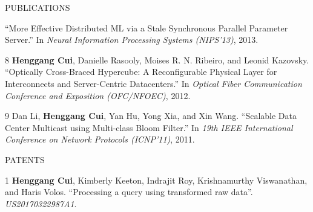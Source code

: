 \documentclass{resume} %
\begin{document}
\begin{rSection}{PUBLICATIONS}
{        ``More Effective Distributed ML via a Stale Synchronous Parallel Parameter Server.''
        In \emph{Neural Information Processing Systems (NIPS'13)}, 2013.
    \item
    [8]
        {\bf Henggang Cui}, Danielle Rasooly, Moises R. N. Ribeiro, and Leonid Kazovsky.
        ``Optically Cross-Braced Hypercube: A Reconfigurable Physical Layer for Interconnects and Server-Centric Datacenters.''
        In \emph{Optical Fiber Communication Conference and Exposition (OFC/NFOEC)}, 2012.
    \item
    [9]
        Dan Li, {\bf Henggang Cui}, Yan Hu, Yong Xia, and Xin Wang.
        ``Scalable Data Center Multicast using Multi-class Bloom Filter.''
        In \emph{19th IEEE International Conference on Network Protocols (ICNP'11)}, 2011.
}
\end{rSection}
\vspace{-.05in}




\begin{rSection}{PATENTS}
\vspace{-.1in}
\small{
    \item
    [1]
        {\bf Henggang Cui}, Kimberly Keeton, Indrajit Roy, Krishnamurthy Viswanathan, and Haris Volos.
        ``Processing a query using transformed raw data''.
        \emph{US20170322987A1}.
}
\end{rSection}
\vspace{-.05in}
\end{document}
